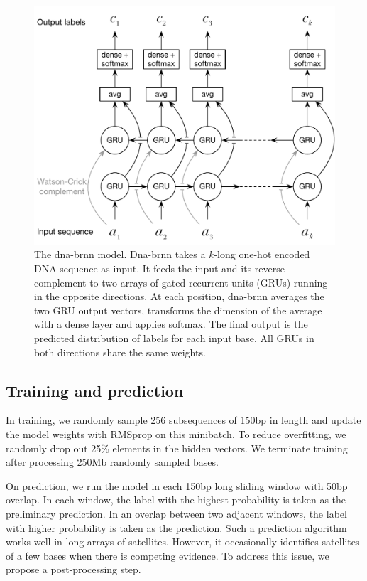 \documentclass{bioinfo}
\begin{document}
\begin{methods}
\begin{figure}[tb]
\includegraphics[width=.49\textwidth]{dna-nn-fig}
\caption{The dna-brnn model. Dna-brnn takes a $k$-long one-hot encoded DNA
sequence as input. It feeds the input and its reverse complement to two arrays
of gated recurrent units (GRUs) running in the opposite directions. At each
position, dna-brnn averages the two GRU output vectors, transforms the
dimension of the average with a dense layer and applies softmax. The final
output is the predicted distribution of labels for each input base. All GRUs in
both directions share the same weights.}\label{fig:model}
\end{figure}

\subsection{Training and prediction}

In training, we randomly sample 256 subsequences of 150bp in length and update
the model weights with RMSprop on this minibatch. To reduce overfitting, we
randomly drop out 25\% elements in the hidden vectors. We terminate
training after processing 250Mb randomly sampled bases.

On prediction, we run the model in each 150bp long sliding window with 50bp
overlap. In each window, the label with the highest probability is taken as the
preliminary prediction. In an overlap between two adjacent windows, the label
with higher probability is taken as the prediction. Such a prediction
algorithm works well in long arrays of satellites. However, it occasionally
identifies satellites of a few bases when there is competing evidence. To
address this issue, we propose a post-processing step.


\end{methods}
\end{document}
